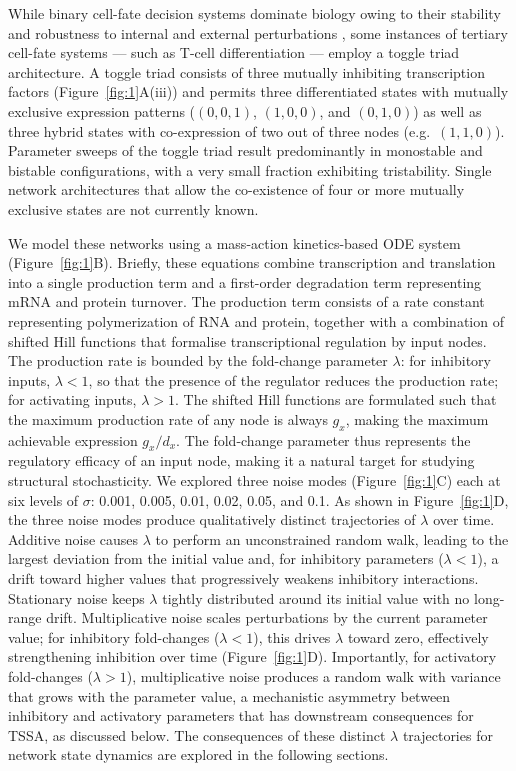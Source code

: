 \documentclass[11pt]{article}
\begin{document}
While binary cell-fate decision systems dominate biology owing to their stability and robustness to internal and external perturbations \cite{harlapur2022functional, Shyam2025MutuallyNetworks}, some instances of tertiary cell-fate systems --- such as T-cell differentiation --- employ a toggle triad architecture. A toggle triad consists of three mutually inhibiting transcription factors (Figure~\ref{fig:1}A(iii)) and permits three differentiated states with mutually exclusive expression patterns ($(0,0,1)$, $(1,0,0)$, and $(0,1,0)$) as well as three hybrid states with co-expression of two out of three nodes (e.g.\ $(1,1,0)$). Parameter sweeps of the toggle triad result predominantly in monostable and bistable configurations, with a very small fraction exhibiting tristability. Single network architectures that allow the co-existence of four or more mutually exclusive states are not currently known.

We model these networks using a mass-action kinetics-based ODE system (Figure~\ref{fig:1}B). Briefly, these equations combine transcription and translation into a single production term and a first-order degradation term representing mRNA and protein turnover. The production term consists of a rate constant representing polymerization of RNA and protein, together with a combination of shifted Hill functions that formalise transcriptional regulation by input nodes. The production rate is bounded by the fold-change parameter $\lambda$: for inhibitory inputs, $\lambda < 1$, so that the presence of the regulator reduces the production rate; for activating inputs, $\lambda > 1$. The shifted Hill functions are formulated such that the maximum production rate of any node is always $g_x$, making the maximum achievable expression $g_x/d_x$. The fold-change parameter thus represents the regulatory efficacy of an input node, making it a natural target for studying structural stochasticity. We explored three noise modes (Figure~\ref{fig:1}C) each at six levels of $\sigma$: 0.001, 0.005, 0.01, 0.02, 0.05, and 0.1. As shown in Figure~\ref{fig:1}D, the three noise modes produce qualitatively distinct trajectories of $\lambda$ over time. Additive noise causes $\lambda$ to perform an unconstrained random walk, leading to the largest deviation from the initial value and, for inhibitory parameters ($\lambda < 1$), a drift toward higher values that progressively weakens inhibitory interactions. Stationary noise keeps $\lambda$ tightly distributed around its initial value with no long-range drift. Multiplicative noise scales perturbations by the current parameter value; for inhibitory fold-changes ($\lambda < 1$), this drives $\lambda$ toward zero, effectively strengthening inhibition over time (Figure~\ref{fig:1}D). Importantly, for activatory fold-changes ($\lambda > 1$), multiplicative noise produces a random walk with variance that grows with the parameter value, a mechanistic asymmetry between inhibitory and activatory parameters that has downstream consequences for TSSA, as discussed below. The consequences of these distinct $\lambda$ trajectories for network state dynamics are explored in the following sections.
\end{document}
